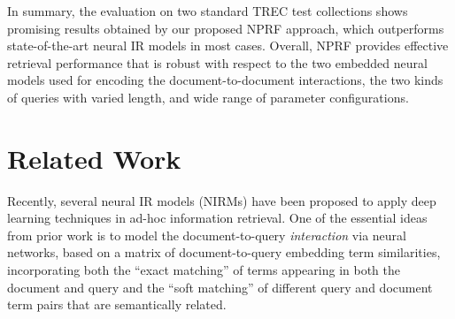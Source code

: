 \documentclass[11pt,a4paper]{article}
\begin{document}
In summary, the evaluation on two standard TREC test collections shows promising results obtained by our proposed NPRF approach, which outperforms state-of-the-art neural IR models in most cases. Overall, NPRF provides effective retrieval performance that is robust with respect to the two embedded neural models used for encoding the document-to-document interactions, the two kinds of queries with varied length, and wide range of parameter configurations.




 \vspace{\vignore}
\section{Related Work}\label{sec:related}
\vspace{\vignore}


Recently, several neural IR models (NIRMs) have been proposed to apply deep learning techniques in ad-hoc information retrieval. One of the essential ideas from prior work is to model the document-to-query {\em interaction} via neural networks,
based on a matrix of document-to-query embedding term similarities, 
incorporating both the ``exact matching'' of terms appearing in both the document and query and the ``soft matching'' of different query and document term pairs that are semantically related.
\end{document}
